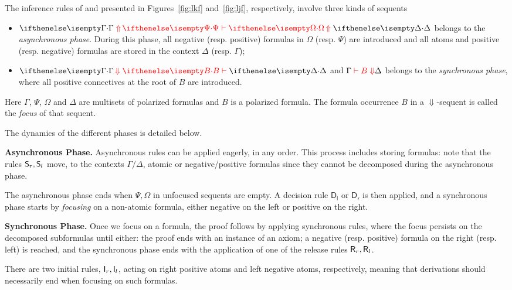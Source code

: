 
The inference rules of \LKF and \LJF presented in
Figures~\ref{fig:lkf} and~\ref{fig:ljf}, respectively, involve three
kinds of sequents  
\begin{itemize}
\item $\jUnf{\Gamma}{\Psi}{\Omega}{\Delta}$ belongs to the {\em
asynchronous phase}. During this phase, all negative (resp. positive)
formulas in  $\Omega$ (resp. $\Psi$) are introduced and all atoms and
positive (resp. negative) formulas  are stored in the context $\Delta$
(resp. $\Gamma$); 
\item $\jLf{\Gamma}{B}{\Delta}$ and $\Gamma \;\textcolor{red}{\vdash B \Downarrow}{\Delta}$ belongs
to the {\em synchronous phase}, where all positive connectives at the
root of $B$ are introduced.  
\end{itemize}
Here $\Gamma$, $\Psi$, $\Omega$ and $\Delta$ are
multisets of polarized formulas and $B$ is a polarized formula.
%
The formula occurrence $B$ in a $\Downarrow$-sequent is called the
\emph{focus} of that sequent.

The dynamics of the different phases is detailed below.

\noindent
{\bf Asynchronous Phase.} Asynchronous rules can be applied eagerly, in any order.
This process includes storing formulas: note that the rules $\mathsf{S}_r, \mathsf{S}_l$ move, to the 
contexts $\Gamma/\Delta$, atomic or negative/positive formulas since they cannot be decomposed during the asynchronous phase.

The asynchronous phase ends when $\Psi,\Omega$ in unfocused sequents are empty. A decision rule $\mathsf{D_l}$ or  $\mathsf{D_r}$ is then applied,  and
a synchronous phase starts by {\em focusing} on a non-atomic formula, either negative on the left or positive on the right.

\noindent
{\bf Synchronous Phase.} Once we focus on a formula, the proof  follows by applying synchronous rules, where  the focus persists on the decomposed subformulas until either: the proof ends with an instance of an axiom;
a negative (resp. positive) formula  on the right (resp. left) is reached, and the synchronous phase  ends with the application of one of the release rules $\mathsf{R}_r,\mathsf{R}_l$.


There are two initial rules, $\mathsf{I}_r,\mathsf{I}_l$, acting on right positive atoms and left negative atoms, respectively, meaning that derivations should necessarily end when focusing on such formulas.


